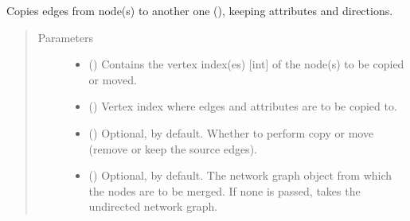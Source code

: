 \documentclass[letterpaper,10pt,english]{sphinxmanual}
\begin{document}
\begin{fulllineitems}
\begin{fulllineitems}
\begin{quote}
\begin{description}
\end{description}\end{quote}

\end{fulllineitems}


\begin{fulllineitems}
\label{\detokenize{main:pypath.main.PyPath.copy_edges}}
Copies edges from  node(s) to another one (),
keeping attributes and directions.
\begin{quote}\begin{description}
\item[{Parameters}] \leavevmode\begin{itemize}
\item {} 
 () \textendash{} Contains the vertex index(es) {[}int{]} of the node(s) to be
copied or moved.

\item {} 
 () \textendash{} Vertex index where edges and attributes are to be copied to.

\item {} 
 () \textendash{} Optional,  by default. Whether to perform copy or
move (remove or keep the source edges).

\item {} 
 () \textendash{} Optional,  by default. The network graph object from
which the nodes are to be merged. If none is passed, takes
the undirected network graph.

\end{itemize}

\end{description}\end{quote}

\end{fulllineitems}


\end{fulllineitems}
\end{document}
